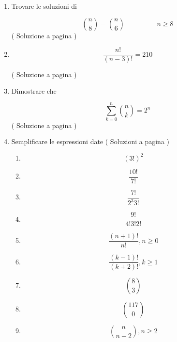 \begin{enumerate}
\item

Trovare le soluzioni di

\[
\binom{n}{8}=\binom{n}{6} \hspace{2cm} n \geq 8
\]
( Soluzione a pagina \pageref{combs_01} \label{combl_01} )



\item 

\[
\frac{n!}{(n-3)!} = 210
\]

( Soluzione a pagina \pageref{combs_02} \label{combl_02} )

\item
Dimostrare che 

\[
\sum_{k=0}^{n}{\binom{n}{k}}=2^n
\]
( Soluzione a pagina \pageref{combs_03} \label{combl_03} )


\item Semplificare le espressioni date
( Soluzioni a pagina \pageref{combs_04} \label{combl_04} )

\begin{enumerate}

\item
\[
(3!)^2
\]


\item 
\[
\frac{10!}{7!}
\]

\item 
\[
\frac{7!}{2^3 3!}
\]

\item 
\[
\frac{9!}{4!3!2!}
\]

\item 
\[
\frac{(n+1)!}{n!}, n\ge 0
\]

\item 
\[
\frac{(k-1)!}{(k+2)!}, k\ge 1
\]

\item 
\[
\binom{8}{3}
\]

\item 
\[
\binom{117}{0}
\]

\item 
\[
\binom{n}{n-2}, n \ge 2
\]

\end{enumerate}






\end{enumerate}
